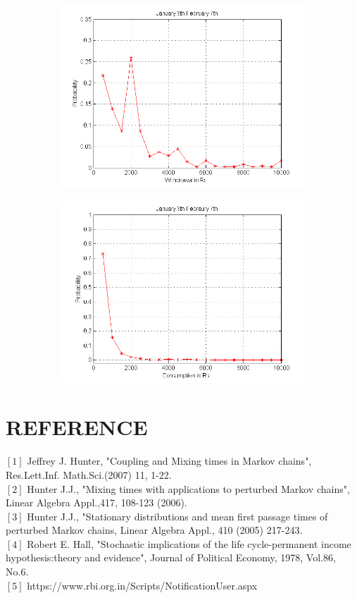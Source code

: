 \documentclass[12pt]{article}
\begin{document}
\begin{figure}[H]
\centering
\begin{subfigure}
  \centering
  \includegraphics[width=.43\linewidth]{WJAN.png}
\end{subfigure}
\begin{subfigure}
  \centering
  \includegraphics[width=.43\linewidth]{CJAN.png}
\end{subfigure}
\label{fig:test}
\end{figure}
\newpage
\section{REFERENCE}
\begin{scriptsize}

\begin{small}
$[1]$ Jeffrey J. Hunter, "Coupling and Mixing times in Markov chains", Res.Lett.Inf. Math.Sci.(2007) 11, 1-22.\\
$[2]$ Hunter J.J., "Mixing times with applications to perturbed Markov chains", Linear Algebra Appl.,417, 108-123 (2006). \\
$[3]$ Hunter J.J., "Stationary distributions and mean first passage times of perturbed Markov chains, Linear Algebra Appl., 410 (2005) 217-243. \\
$[4]$ Robert E. Hall, "Stochastic implications of the life cycle-permanent income hypothesis:theory and evidence", Journal of Political Economy, 1978, Vol.86, No.6.
 \\
$[5]$ https://www.rbi.org.in/Scripts/NotificationUser.aspx\\
\end{small}
\end{scriptsize}




 
\end{document}

